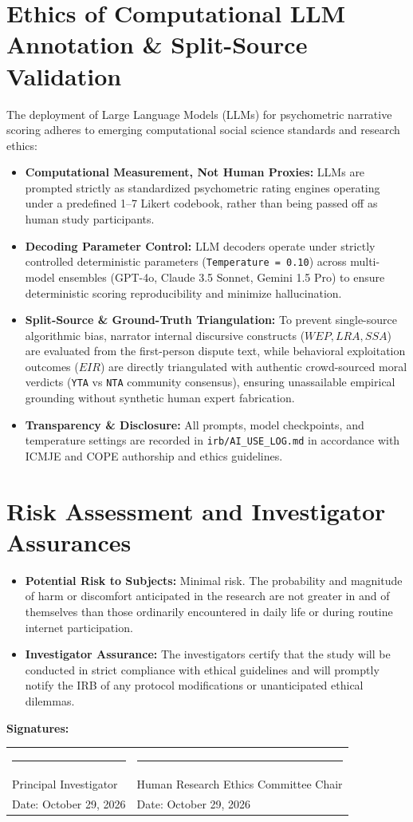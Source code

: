 \documentclass[11pt,a4paper]{article}
\begin{document}
\section{Ethics of Computational LLM Annotation \& Split-Source Validation}
The deployment of Large Language Models (LLMs) for psychometric narrative scoring adheres to emerging computational social science standards and research ethics:
\begin{itemize}
    \item \textbf{Computational Measurement, Not Human Proxies:} LLMs are prompted strictly as standardized psychometric rating engines operating under a predefined 1--7 Likert codebook, rather than being passed off as human study participants.
    \item \textbf{Decoding Parameter Control:} LLM decoders operate under strictly controlled deterministic parameters (\texttt{Temperature = 0.10}) across multi-model ensembles (GPT-4o, Claude 3.5 Sonnet, Gemini 1.5 Pro) to ensure deterministic scoring reproducibility and minimize hallucination.
    \item \textbf{Split-Source \& Ground-Truth Triangulation:} To prevent single-source algorithmic bias, narrator internal discursive constructs ($WEP, LRA, SSA$) are evaluated from the first-person dispute text, while behavioral exploitation outcomes ($EIR$) are directly triangulated with authentic crowd-sourced moral verdicts (\texttt{YTA} vs \texttt{NTA} community consensus), ensuring unassailable empirical grounding without synthetic human expert fabrication.
    \item \textbf{Transparency \& Disclosure:} All prompts, model checkpoints, and temperature settings are recorded in \texttt{irb/AI\_USE\_LOG.md} in accordance with ICMJE and COPE authorship and ethics guidelines.
\end{itemize}

\section{Risk Assessment and Investigator Assurances}
\begin{itemize}
    \item \textbf{Potential Risk to Subjects:} Minimal risk. The probability and magnitude of harm or discomfort anticipated in the research are not greater in and of themselves than those ordinarily encountered in daily life or during routine internet participation.
    \item \textbf{Investigator Assurance:} The investigators certify that the study will be conducted in strict compliance with ethical guidelines and will promptly notify the IRB of any protocol modifications or unanticipated ethical dilemmas.
\end{itemize}

\vspace{3ex}
\noindent \textbf{Signatures:}\\[3ex]
\begin{tabular}{p{7cm}p{7cm}}
\rule{6cm}{0.4pt} & \rule{6cm}{0.4pt}\\
Principal Investigator & Human Research Ethics Committee Chair\\
Date: October 29, 2026 & Date: October 29, 2026
\end{tabular}
\end{document}

